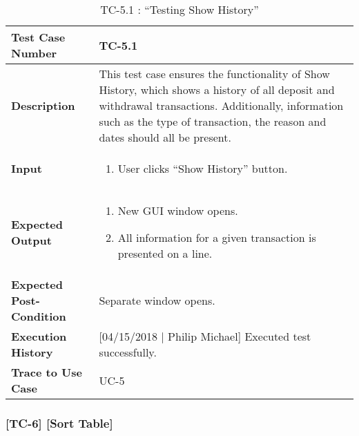 \documentclass[12pt]{article}
\begin{document}
\begin{table}[H]
\caption{TC-5.1 : “Testing Show History”}
\begin{center}
\begin{tabular}{|p{5.5	cm}|p{11cm}|}
\hline
\bf Test Case Number & TC-5.1\\
\hline
\bf Description & This test case ensures the functionality of Show History, which shows a history of all deposit and withdrawal transactions. Additionally, information such as the type of transaction, the reason and dates should all be present.\\
\hline
\bf Input &
\begin{enumerate}
\item User clicks ``Show History'' button.
\end{enumerate}
\\
\hline
\bf Expected Output &
\begin{enumerate}
\item New GUI window opens.
\item All information for a given transaction is presented on a line.
\end{enumerate}
\\
\hline
\bf Expected Post-Condition & Separate window opens.\\\hline
\bf Execution History & [04/15/2018 | Philip Michael] Executed test successfully.\\\hline
\bf Trace to Use Case & UC-5 \\

\hline
\end{tabular}
\end{center}
\end{table}

\subsubsection{[TC-6] [Sort Table]} \label{tc:6}
\end{document}

